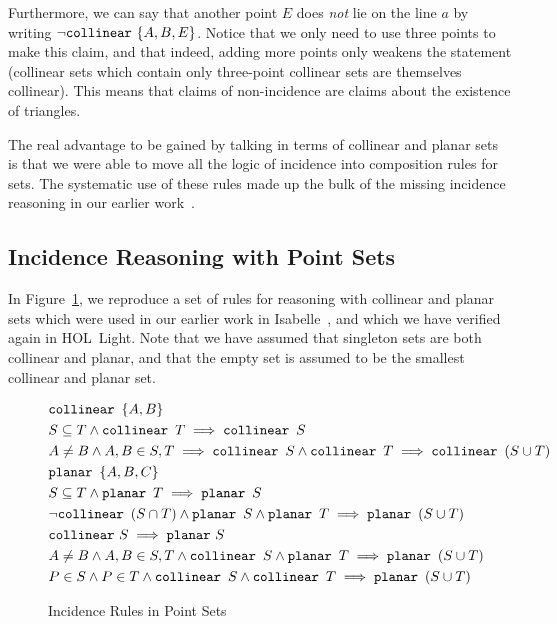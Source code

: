 Furthermore, we can say that another point $E$ does \emph{not} lie on the line $a$ by writing $\neg \texttt{collinear}\ \{A, B, E\}$. Notice that we only need to use three points to make this claim, and that indeed, adding more points only weakens the statement (collinear sets which contain only three-point collinear sets are themselves collinear). This means that claims of non-incidence are claims about the existence of triangles.

The real advantage to be gained by talking in terms of collinear and planar sets is that we were able to move all the logic of incidence into composition rules for sets. The systematic use of these rules made up the bulk of the missing incidence reasoning in our earlier work~\cite{ScottMScThesis}.

\subsection{Incidence Reasoning with Point Sets}\label{sec:PointSets}
In Figure~\ref{fig:PointSets}, we reproduce a set of rules for reasoning with collinear and planar sets which were used in our earlier work in Isabelle~\cite{ScottMScThesis}, and which we have verified again in HOL~Light. Note that we have assumed that singleton sets are both collinear and planar, and that the empty set is assumed to be the smallest collinear and planar set. 

\begin{figure}
\begin{align}
&\texttt{collinear}\ \, \{A,B\} \label{rule:colltwo}\\
&S \subseteq T \wedge \texttt{collinear}\ \, T \implies \texttt{collinear}\ \, S
  \label{rule:collsubset}\\
&A \neq B \wedge A,B \in S,T \implies \texttt{collinear}\ \, S \wedge \texttt{collinear}\ \, T \implies \texttt{collinear}\ \, (S \cup T) \label{rule:collunion}\\
&\texttt{planar}\ \, \{A,B,C\} \label{rule:planethree}\\
&S \subseteq T \wedge \texttt{planar}\ \, T \implies \texttt{planar}\ \, S
  \label{rule:planesubset}\\
&\neg\texttt{collinear}\ \, (S \cap T) \wedge \texttt{planar}\ \, S \wedge \texttt{planar}\ \, T \implies \texttt{planar}\ \, (S \cup T) \label{rule:planeunion}\\
&\texttt{collinear}\  S \implies \texttt{planar}\  S \label{rule:collplane}\\
&A \neq B \wedge A,B \in S,T \wedge \texttt{collinear}\ \, S \wedge \texttt{planar}\ \, T \implies \texttt{planar}\ \, (S \cup T) \label{rule:collplaneplane}\\
&P \in S \wedge P \in T \wedge \texttt{collinear}\ \, S \wedge \texttt{collinear}\ \, T \implies \texttt{planar}\ \, (S \cup T) \label{rule:collcollplane}
\end{align}
\caption{Incidence Rules in Point Sets}\label{fig:PointSets}
\end{figure}

